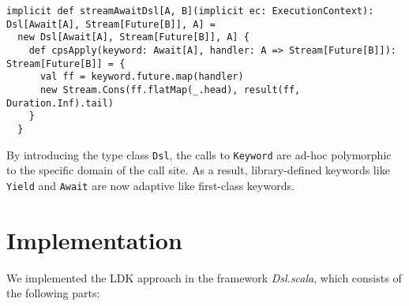 \begin{lstlisting}[caption={The \lstinline{Dsl} type class instance of \lstinline{Await} for creating asynchronous generators},label={Await-async-generator-instance}]
implicit def streamAwaitDsl[A, B](implicit ec: ExecutionContext): Dsl[Await[A], Stream[Future[B]], A] =
  new Dsl[Await[A], Stream[Future[B]], A] {
    def cpsApply(keyword: Await[A], handler: A => Stream[Future[B]]): Stream[Future[B]] = {
      val ff = keyword.future.map(handler)
      new Stream.Cons(ff.flatMap(_.head), result(ff, Duration.Inf).tail)
    }
  }
\end{lstlisting}

By introducing the type class \lstinline{Dsl}, the calls to \lstinline{Keyword} are ad-hoc polymorphic to the specific domain of the call site. As a result, library-defined keywords like \lstinline{Yield} and \lstinline{Await} are now adaptive like first-class keywords.

\section{Implementation}\label{Implementation}

We implemented the LDK approach in the framework \textit{Dsl.scala}, which consists of the following parts:

